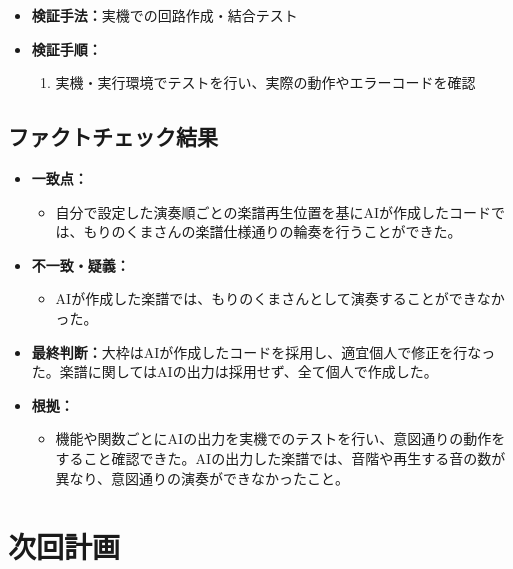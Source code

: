 \documentclass[uplatex,dvipdfmx]{jlreq}
\begin{document}
\begin{itemize}
    \item \textbf{検証手法：}実機での回路作成・結合テスト
    \item \textbf{検証手順：}
    \begin{enumerate}
        \item 実機・実行環境でテストを行い、実際の動作やエラーコードを確認
    \end{enumerate}
\end{itemize}

\subsection{ファクトチェック結果}

\begin{itemize}
    \item \textbf{一致点：}
    \begin{itemize}
        \item 自分で設定した演奏順ごとの楽譜再生位置を基にAIが作成したコードでは、もりのくまさんの楽譜仕様通りの輪奏を行うことができた。
    \end{itemize}
    \item \textbf{不一致・疑義：}
    \begin{itemize}
        \item AIが作成した楽譜では、もりのくまさんとして演奏することができなかった。
    \end{itemize}
    \item \textbf{最終判断：}大枠はAIが作成したコードを採用し、適宜個人で修正を行なった。楽譜に関してはAIの出力は採用せず、全て個人で作成した。
    \item \textbf{根拠：}
    \begin{itemize}
        \item 機能や関数ごとにAIの出力を実機でのテストを行い、意図通りの動作をすること確認できた。AIの出力した楽譜では、音階や再生する音の数が異なり、意図通りの演奏ができなかったこと。
    \end{itemize}
\end{itemize}

\section{次回計画}
\end{document}
